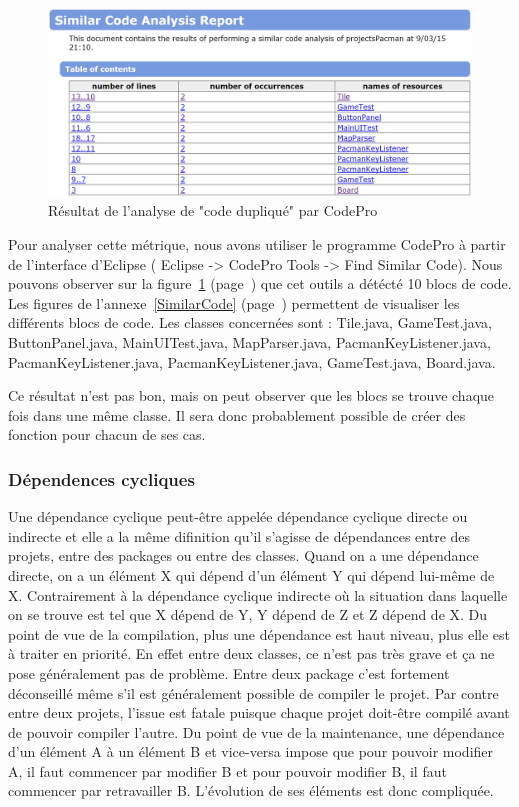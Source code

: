 \documentclass[12pt,a4paper,final]{article}
\newcommand{\annexe}[1]{annexe~\ref{#1} (page~\pageref{#1})}
\newcommand{\labelfigure}[1]{figure~\ref{#1} (page~\pageref{#1})}
\begin{document}
\begin{figure}[!h]
	\centering
	\includegraphics[width=\textwidth]{SimilarCode_00.png}
	\caption{\label{SimilarCode0}Résultat de l'analyse de "code dupliqué" par CodePro}
\end{figure}

Pour analyser cette métrique, nous avons utiliser le programme CodePro à partir de l'interface d'Eclipse ( Eclipse -> CodePro Tools -> Find Similar Code).
Nous pouvons observer sur la \labelfigure{SimilarCode0} que cet outils a détécté 10 blocs de code. Les figures de l'\annexe{SimilarCode} permettent de visualiser les différents blocs de code.
Les classes concernées sont : Tile.java, GameTest.java, ButtonPanel.java, MainUITest.java, MapParser.java, PacmanKeyListener.java, PacmanKeyListener.java, PacmanKeyListener.java,  GameTest.java, Board.java.

Ce résultat n'est pas bon, mais on peut observer que les blocs se trouve chaque fois dans une même classe. Il sera donc probablement possible de créer des fonction pour chacun de ses cas.



\subsubsection{Dépendences cycliques}\label{dépendances}
Une dépendance cyclique peut-être appelée dépendance cyclique directe ou indirecte et elle a la même difinition qu'il s'agisse de dépendances entre des projets, entre des packages ou entre des classes. Quand on a une dépendance directe, on a un élément X qui dépend d’un élément Y qui dépend lui-même de X. Contrairement à la dépendance cyclique indirecte où la situation dans laquelle on se trouve est tel que X dépend de Y, Y dépend de Z et Z dépend de X.
Du point de vue de la compilation, plus une dépendance est haut niveau, plus elle est à traiter en priorité. En effet entre deux classes, ce n'est pas très grave et ça ne pose généralement pas de problème. Entre deux package c'est fortement déconseillé même s'il est généralement possible de compiler le projet. Par contre entre deux projets, l'issue est fatale puisque chaque projet doit-être compilé avant de pouvoir compiler l'autre.
Du point de vue de la maintenance, une dépendance d'un élément A à un élément B et vice-versa impose que pour pouvoir modifier A, il faut commencer par modifier B et pour pouvoir modifier B, il faut commencer par retravailler B. L'évolution de ses éléments est donc compliquée.
\end{document}
